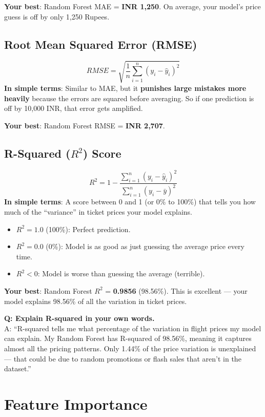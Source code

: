 \documentclass[12pt, a4paper]{article}
\begin{document}
\textbf{Your best}: Random Forest MAE = \textbf{INR 1,250}. On average, your model's price guess is off by only 1,250 Rupees.

\subsection{Root Mean Squared Error (RMSE)}
\[
    RMSE = \sqrt{\frac{1}{n} \sum_{i=1}^{n} (y_i - \hat{y}_i)^2}
\]
\textbf{In simple terms}: Similar to MAE, but it \textbf{punishes large mistakes more heavily} because the errors are squared before averaging. So if one prediction is off by 10,000 INR, that error gets amplified.

\textbf{Your best}: Random Forest RMSE = \textbf{INR 2,707}.

\subsection{R-Squared ($R^2$) Score}
\[
    R^2 = 1 - \frac{\sum_{i=1}^{n}(y_i - \hat{y}_i)^2}{\sum_{i=1}^{n}(y_i - \bar{y})^2}
\]
\textbf{In simple terms}: A score between 0 and 1 (or 0\% to 100\%) that tells you how much of the ``variance'' in ticket prices your model explains.
\begin{itemize}
    \item $R^2 = 1.0$ (100\%): Perfect prediction.
    \item $R^2 = 0.0$ (0\%): Model is as good as just guessing the average price every time.
    \item $R^2 < 0$: Model is worse than guessing the average (terrible).
\end{itemize}

\textbf{Your best}: Random Forest $R^2$ = \textbf{0.9856} (98.56\%). This is excellent — your model explains 98.56\% of all the variation in ticket prices.

\begin{warnbox}
    \textbf{Q: Explain R-squared in your own words.} \\
    A: ``R-squared tells me what percentage of the variation in flight prices my model can explain. My Random Forest has R-squared of 98.56\%, meaning it captures almost all the pricing patterns. Only 1.44\% of the price variation is unexplained — that could be due to random promotions or flash sales that aren't in the dataset.''
\end{warnbox}


\section{Feature Importance}
\end{document}
